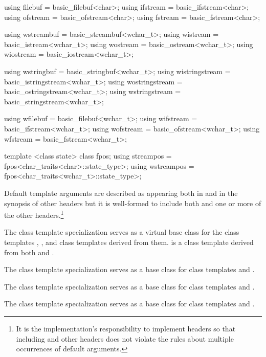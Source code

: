 \begin{codeblock}
{  using filebuf  = basic_filebuf<char>;
  using ifstream = basic_ifstream<char>;
  using ofstream = basic_ofstream<char>;
  using fstream  = basic_fstream<char>;

  using wstreambuf = basic_streambuf<wchar_t>;
  using wistream   = basic_istream<wchar_t>;
  using wostream   = basic_ostream<wchar_t>;
  using wiostream  = basic_iostream<wchar_t>;

  using wstringbuf     = basic_stringbuf<wchar_t>;
  using wistringstream = basic_istringstream<wchar_t>;
  using wostringstream = basic_ostringstream<wchar_t>;
  using wstringstream  = basic_stringstream<wchar_t>;

  using wfilebuf  = basic_filebuf<wchar_t>;
  using wifstream = basic_ifstream<wchar_t>;
  using wofstream = basic_ofstream<wchar_t>;
  using wfstream  = basic_fstream<wchar_t>;

  template <class state> class fpos;
  using streampos  = fpos<char_traits<char>::state_type>;
  using wstreampos = fpos<char_traits<wchar_t>::state_type>;
}
\end{codeblock}

\pnum
Default template arguments are described as appearing both in
and in the synopsis of other headers
but it is well-formed to include both
and one or more of the other headers.\footnote{It is the implementation's
responsibility to implement headers so
that including
and other headers does not violate the rules about
multiple occurrences of default arguments.}

\pnum
\enternote
The
class template specialization
serves as a virtual base class for the
class templates
,
,
and
class templates
derived from them.
is a class
template
derived from both
and
.

\pnum
The
class template specialization
serves as a base class for class templates
and
.

\pnum
The
class template specialization
serves as a base class for class templates
and
.

\pnum
The
class template specialization
serves as a base class for class templates
and
.


